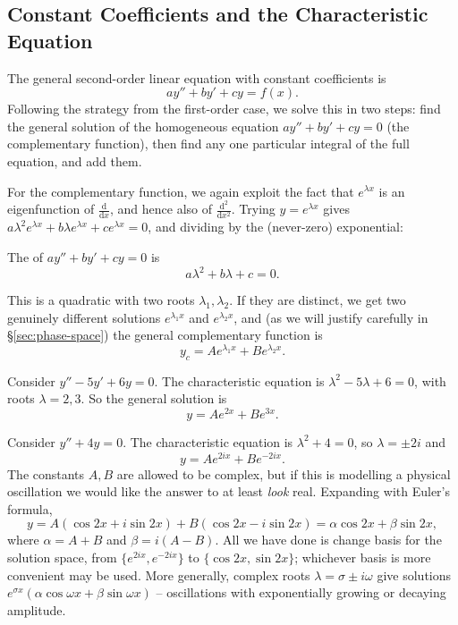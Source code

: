 \subsection{Constant Coefficients and the Characteristic Equation}

The general second-order linear equation with constant coefficients is
$$
a y'' + b y' + c y = f(x).
$$
Following the strategy from the first-order case, we solve this in two steps: find the general solution of the homogeneous equation $ay'' + by' + cy = 0$ (the complementary function), then find any one particular integral of the full equation, and add them.

For the complementary function, we again exploit the fact that $e^{\lambda x}$ is an eigenfunction of $\frac{\mathrm{d}}{\mathrm{d}x}$, and hence also of $\frac{\mathrm{d}^2}{\mathrm{d}x^2}$. Trying $y = e^{\lambda x}$ gives $a\lambda^2 e^{\lambda x} + b \lambda e^{\lambda x} + c e^{\lambda x} = 0$, and dividing by the (never-zero) exponential:

\begin{definition}
	The  of $ay'' + by' + cy = 0$ is
	$$
	a\lambda^2 + b\lambda + c = 0.
	$$
\end{definition}

This is a quadratic with two roots $\lambda_1, \lambda_2$. If they are distinct, we get two genuinely different solutions $e^{\lambda_1 x}$ and $e^{\lambda_2 x}$, and (as we will justify carefully in \S\ref{sec:phase-space}) the general complementary function is
$$
y_c = A e^{\lambda_1 x} + B e^{\lambda_2 x}.
$$

\begin{example}
	Consider $y'' - 5y' + 6y = 0$. The characteristic equation is $\lambda^2 - 5\lambda + 6 = 0$, with roots $\lambda = 2, 3$. So the general solution is
	$$
	y = A e^{2x} + B e^{3x}.
	$$
\end{example}

\begin{example}
	Consider $y'' + 4y = 0$. The characteristic equation is $\lambda^2 + 4 = 0$, so $\lambda = \pm 2i$ and
	$$
	y = A e^{2ix} + B e^{-2ix}.
	$$
	The constants $A, B$ are allowed to be complex, but if this is modelling a physical oscillation we would like the answer to at least \emph{look} real. Expanding with Euler's formula,
	$$
	y = A(\cos 2x + i \sin 2x) + B (\cos 2x - i \sin 2x) = \alpha \cos 2x + \beta \sin 2x,
	$$
	where $\alpha = A + B$ and $\beta = i(A - B)$. All we have done is change basis for the solution space, from $\{e^{2ix}, e^{-2ix}\}$ to $\{\cos 2x, \sin 2x\}$; whichever basis is more convenient may be used. More generally, complex roots $\lambda = \sigma \pm i\omega$ give solutions $e^{\sigma x}(\alpha \cos \omega x + \beta \sin \omega x)$ -- oscillations with exponentially growing or decaying amplitude.
\end{example}

